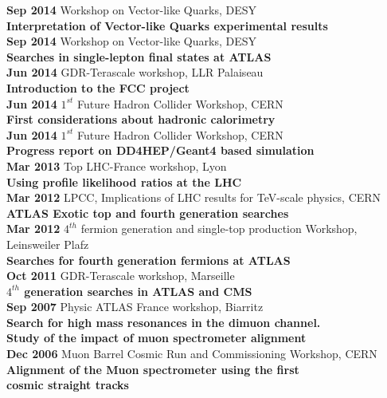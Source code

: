 \documentclass[12pt]{article}
\begin{document}
\begin{tabbing}
  \> {\bf Sep 2014} \> Workshop on Vector-like Quarks, DESY\>  \\
  \> \>  {\bf Interpretation of Vector-like Quarks experimental results} \> \\[0.2cm]

  \> {\bf Sep 2014} \> Workshop on Vector-like Quarks, DESY\>  \\
  \> \>  {\bf Searches in single-lepton final states at ATLAS} \> \\[0.2cm]

  \> {\bf Jun 2014} \>GDR-Terascale workshop, LLR Palaiseau \>  \\
  \> \>  {\bf Introduction to the FCC project} \> \\[0.2cm]

  \> {\bf Jun 2014} \>  $1^{st}$ Future Hadron Collider Workshop, CERN\>  \\
  \> \>  {\bf First considerations about hadronic calorimetry} \> \\[0.2cm]

  \> {\bf Jun 2014} \>  $1^{st}$ Future Hadron Collider Workshop, CERN \>  \\
  \> \>  {\bf Progress report on DD4HEP/Geant4 based simulation} \> \\[0.2cm]

  \> {\bf Mar 2013} \> Top LHC-France workshop, Lyon \>  \\
  \> \>  {\bf Using profile likelihood ratios at the LHC} \> \\[0.2cm]

  \> {\bf Mar 2012} \> LPCC, Implications of LHC results for TeV-scale physics, CERN \>  \\
  \> \>  {\bf ATLAS Exotic top and fourth generation searches} \> \\[0.2cm]

  \> {\bf Mar 2012} \> $4^{th}$ fermion generation and single-top production Workshop, Leinsweiler Plafz \>  \\
  \> \>  {\bf Searches for fourth generation fermions at ATLAS} \> \\[0.2cm]

  \> {\bf Oct 2011} \> GDR-Terascale workshop, Marseille \>  \\
  \> \>  {\bf $4^{th}$ generation searches in ATLAS and CMS} \> \\[0.2cm]

  \> {\bf Sep 2007} \> Physic ATLAS France workshop, Biarritz \>  \\
  \> \>  {\bf Search for high mass resonances in the dimuon channel. } \> \\
  \> \>  {\bf Study of the impact of muon spectrometer alignment} \> \\[0.2cm]
  
  \> {\bf Dec 2006} \> Muon Barrel Cosmic Run and Commissioning Workshop, CERN \>  \\
  \> \>  {\bf Alignment of the Muon spectrometer using the first} \> \\
  \> \>  {\bf cosmic straight tracks} \> \\[0.2cm]

\end{tabbing}
\end{document}
